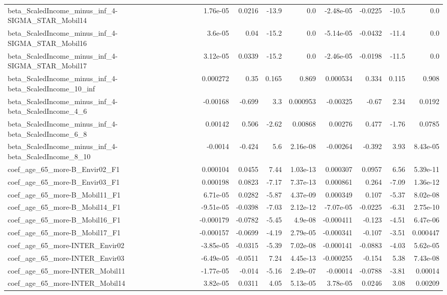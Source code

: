 \begin{tabular}{lrrrrrrrr}
beta_ScaledIncome_minus_inf_4-SIGMA_STAR_Mobil14 & 1.76e-05 & 0.0216 & -13.9 & 0.0 & -2.48e-05 & -0.0225 & -10.5 & 0.0 \\
beta_ScaledIncome_minus_inf_4-SIGMA_STAR_Mobil16 & 3.6e-05 & 0.04 & -15.2 & 0.0 & -5.14e-05 & -0.0432 & -11.4 & 0.0 \\
beta_ScaledIncome_minus_inf_4-SIGMA_STAR_Mobil17 & 3.12e-05 & 0.0339 & -15.2 & 0.0 & -2.46e-05 & -0.0198 & -11.5 & 0.0 \\
beta_ScaledIncome_minus_inf_4-beta_ScaledIncome_10_inf & 0.000272 & 0.35 & 0.165 & 0.869 & 0.000534 & 0.334 & 0.115 & 0.908 \\
beta_ScaledIncome_minus_inf_4-beta_ScaledIncome_4_6 & -0.00168 & -0.699 & 3.3 & 0.000953 & -0.00325 & -0.67 & 2.34 & 0.0192 \\
beta_ScaledIncome_minus_inf_4-beta_ScaledIncome_6_8 & 0.00142 & 0.506 & -2.62 & 0.00868 & 0.00276 & 0.477 & -1.76 & 0.0785 \\
beta_ScaledIncome_minus_inf_4-beta_ScaledIncome_8_10 & -0.0014 & -0.424 & 5.6 & 2.16e-08 & -0.00264 & -0.392 & 3.93 & 8.43e-05 \\
coef_age_65_more-B_Envir02_F1 & 0.000104 & 0.0455 & 7.44 & 1.03e-13 & 0.000307 & 0.0957 & 6.56 & 5.39e-11 \\
coef_age_65_more-B_Envir03_F1 & 0.000198 & 0.0823 & -7.17 & 7.37e-13 & 0.000861 & 0.264 & -7.09 & 1.36e-12 \\
coef_age_65_more-B_Mobil11_F1 & 6.71e-05 & 0.0282 & -5.87 & 4.37e-09 & 0.000349 & 0.107 & -5.37 & 8.02e-08 \\
coef_age_65_more-B_Mobil14_F1 & -9.51e-05 & -0.0398 & -7.03 & 2.12e-12 & -7.07e-05 & -0.0225 & -6.31 & 2.75e-10 \\
coef_age_65_more-B_Mobil16_F1 & -0.000179 & -0.0782 & -5.45 & 4.9e-08 & -0.000411 & -0.123 & -4.51 & 6.47e-06 \\
coef_age_65_more-B_Mobil17_F1 & -0.000157 & -0.0699 & -4.19 & 2.79e-05 & -0.000341 & -0.107 & -3.51 & 0.000447 \\
coef_age_65_more-INTER_Envir02 & -3.85e-05 & -0.0315 & -5.39 & 7.02e-08 & -0.000141 & -0.0883 & -4.03 & 5.62e-05 \\
coef_age_65_more-INTER_Envir03 & -6.49e-05 & -0.0511 & 7.24 & 4.45e-13 & -0.000255 & -0.154 & 5.38 & 7.43e-08 \\
coef_age_65_more-INTER_Mobil11 & -1.77e-05 & -0.014 & -5.16 & 2.49e-07 & -0.00014 & -0.0788 & -3.81 & 0.00014 \\
coef_age_65_more-INTER_Mobil14 & 3.82e-05 & 0.0311 & 4.05 & 5.13e-05 & 3.78e-05 & 0.0246 & 3.08 & 0.00209 \\

\end{tabular}
